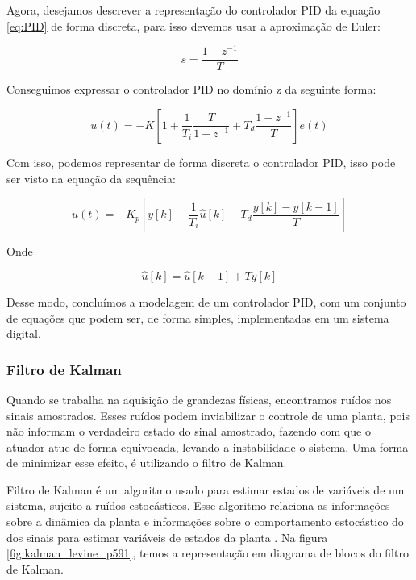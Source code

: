 Agora, desejamos descrever a representação do controlador PID da equação \ref{eq:PID} de forma discreta, para isso devemos usar a aproximação de Euler:

\begin{equation}
  s = \frac{1-z^{-1}}{T}
\end{equation}

Conseguimos expressar o controlador PID no domínio z da seguinte forma:

\begin{equation}
  u(t) = -K\left[1 + \frac{1}{T_i}\frac{T}{1-z^{-1}} + T_d\frac{1-z^{-1}}{T} \right]e(t)
\end{equation}

Com isso, podemos representar de forma discreta o controlador PID, isso pode ser visto na equação da sequência:

\begin{equation}\label{eq:pid_equation}
  u(t) = -K_p\left[y[k]-\frac{1}{T_i}{\hat{u}[k]}-T_d\frac{y[k]-y[k-1]}{T}\right]
\end{equation}

Onde

\begin{equation}
  \hat{u}[k] = \hat{u}[k-1] +Ty[k]
\end{equation}

Desse modo, concluímos a modelagem de um controlador PID, com um conjunto de equações que podem ser, de forma simples, implementadas em um sistema digital.



\subsubsection{Filtro de Kalman}

Quando se trabalha na aquisição de grandezas físicas, encontramos ruídos nos sinais amostrados. Esses ruídos podem inviabilizar o controle de uma planta, pois não informam o verdadeiro estado do sinal amostrado, fazendo com que o atuador atue de forma equivocada, levando a instabilidade o sistema. Uma forma de minimizar esse efeito, é utilizando o filtro de Kalman.

Filtro de Kalman é um algoritmo usado para estimar estados de variáveis de um sistema, sujeito a ruídos estocásticos. Esse algoritmo relaciona as informações sobre a dinâmica da planta e informações sobre o comportamento estocástico do dos sinais para estimar variáveis de estados da planta \cite{Levine1996}. Na figura \ref{fig:kalman_levine_p591}, temos a representação em diagrama de blocos do filtro de Kalman.

